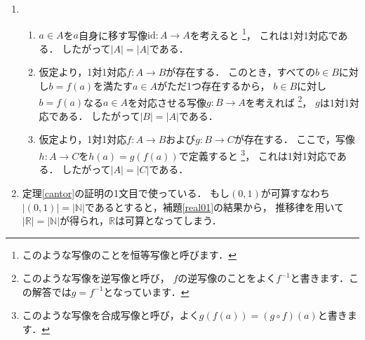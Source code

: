 \documentclass[./main]{subfiles} %
\theoremstyle{definition}
\begin{document}
\begin{enumerate}
\item
\begin{enumerate}
\item $a\in A$を$a$自身に移す写像$\mathrm{id}\colon A\to A$を考えると
\footnote{このような写像のことを恒等写像と呼びます．}，
これは1対1対応である．
したがって$|A|=|A|$である．
\item 仮定より，1対1対応$f\colon A\to B$が存在する．
このとき，すべての$b\in B$に対し$b=f(a)$を満たす$a\in A$がただ1つ存在するから，
$b\in B$に対し$b=f(a)$なる$a\in A$を対応させる写像$g\colon B\to A$を考えれば
\footnote{このような写像を逆写像と呼び，
$f$の逆写像のことをよく$f^{-1}$と書きます．この解答では$g=f^{-1}$となっています．}，
$g$は1対1対応である．
したがって$|B|=|A|$である．
\item 仮定より，1対1対応$f\colon A\to B$および$g\colon B\to C$が存在する．
ここで，写像$h\colon A\to C$を$h(a)=g(f(a))$で定義すると
\footnote{このような写像を合成写像と呼び，よく$g(f(a))=(g\circ f)(a)$と書きます．}，
これは1対1対応である．
したがって$|A|=|C|$である．
\end{enumerate}
\item 定理\ref{cantor}の証明の1文目で使っている．
もし$(0,1)$が可算すなわち$|(0,1)|=|\mathbb{N}|$であるとすると，補題\ref{real01}の結果から，
推移律を用いて$|\mathbb{R}|=|\mathbb{N}|$が得られ，$\mathbb{R}$は可算となってしまう．
\end{enumerate}
\end{document}
